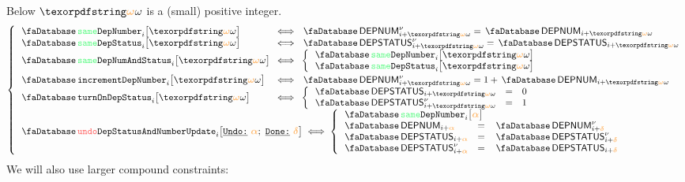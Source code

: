 Below $\relof$ is a (small) positive integer.
\[
	\left\{ \begin{array}{lcl}
		\accSameDeploymentNumber  {i}{\relof} & \!\!\! \iff \!\!\! & \accDepNumber\new_{i + \relof} = \accDepNumber_{i + \relof} \\
		\accSameDeploymentStatus  {i}{\relof} & \!\!\! \iff \!\!\! & \accDepStatus\new_{i + \relof} = \accDepStatus_{i + \relof} \\
		\accSameDeployment        {i}{\relof} & \!\!\! \iff \!\!\! &
		\left\{ \begin{array}{lcl}
			\multicolumn{3}{l}{\accSameDeploymentNumber {i}{\relof} } \\
			\multicolumn{3}{l}{\accSameDeploymentStatus {i}{\relof} } \\
		\end{array} \right. \vspace{1mm} \\
		\accIncrementDeploymentNumber    {i}{\relof} & \!\!\! \iff \!\!\! & \accDepNumber\new_{i + \relof} = 1 + \accDepNumber_{i + \relof} \\
		\accTurnOnDepStatus       {i}{\relof} & \!\!\! \iff \!\!\! &
		\left\{ \begin{array}{lcl}
			\accDepStatus      _{i + \relof} & = & 0 \\
			\accDepStatus\new  _{i + \relof} & = & 1 \\
		\end{array} \right. \\
		\multicolumn{3}{l}{
			\accUndoDeploymentStatusAndNumberUpdate {i}{\reluo}{\reldo} \iff
			\left\{ \begin{array}{lcl}
				\multicolumn{3}{l}{\accSameDeploymentNumber {i}{\reluo}} \\
				\accDepNumber     _{i + \reluo} & = & \accDepNumber\new   _{i + \reldo} \\
				\accDepStatus     _{i + \reluo} & = & \accDepStatus\new   _{i + \reldo} \\
				\accDepStatus\new _{i + \reluo} & = & \accDepStatus       _{i + \reldo} \\
			\end{array} \right. } \\
	\end{array} \right.
\]
We will also use larger compound constraints:

